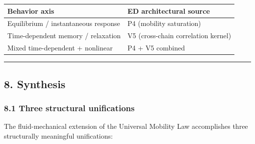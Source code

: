\documentclass[
  11pt,a4paper]{article}
\newcounter{none} %
\begin{document}
{\def\LTcaptype{none} %
\begin{longtable}[]{@{}
  >{\raggedright\arraybackslash}p{}
  >{\raggedright\arraybackslash}p{}@{}}
\toprule\noalign{}
\begin{minipage}[b]{\linewidth}\raggedright
Behavior axis
\end{minipage} & \begin{minipage}[b]{\linewidth}\raggedright
ED architectural source
\end{minipage} \\
\midrule\noalign{}
\endhead
\bottomrule\noalign{}
\endlastfoot
Equilibrium / instantaneous response & P4 (mobility saturation) \\
Time-dependent memory / relaxation & V5 (cross-chain correlation
kernel) \\
Mixed time-dependent + nonlinear & P4 + V5 combined \\
\end{longtable}
}

\begin{center}\rule{0.5\linewidth}{0.5pt}\end{center}

\subsection{8. Synthesis}\label{synthesis}

\subsubsection{8.1 Three structural
unifications}\label{three-structural-unifications}

The fluid-mechanical extension of the Universal Mobility Law
accomplishes three structurally meaningful unifications:
\end{document}
